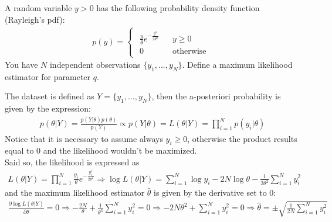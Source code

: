 \Exercise[number={8}]
A random variable \(y>0\) has the following probability density function
(Rayleigh's pdf):
\begin{align*}
    p(y)=
    \begin{cases}
        \begin{matrix}
            \frac{y}{\theta}e^{-\frac{y^2}{2\theta^2}} && y\ge0 \\ 0 && \text{otherwise}
        \end{matrix}
    \end{cases}
\end{align*}
You have \(N\) independent observations \(\{y_1,...,y_N\}\). Define a
maximum likelihood estimator for parameter \(q\). 

\Answer[number={8}]
The dataset is defined as \(Y=\{y_1,...,y_N\}\), then the a-posteriori
probability is given by the expression:
\begin{align*}
    p(\theta|Y)=\frac{p(Y|\theta)p(\theta)}{p(Y)}
    \propto
    p(Y|\theta)=L(\theta|Y)=\prod_{i=1}^{N}p(y_i|\theta)
\end{align*}
Notice that it is necessary to assume always \(y_i\ge0\), otherwise the
product results equal to 0 and the likelihood wouldn't be maximized. \\
Said so, the likelihood is expressed as
\begin{align*}
    L(\theta|Y)=\prod_{i=1}^{N}\frac{y_i}{\theta}e^{-\frac{y_i^2}{2\theta^2}}
    \Rightarrow
    \log{L(\theta|Y)}=\sum_{i=1}^{N}\log{y_i} - 2N\log{\theta} - \frac{1}{2\theta^2}\sum_{i=1}^{N}y_i^2
\end{align*}
and the maximum likelihood estimator \(\hat{\theta}\) is given by the derivative
set to 0:
\begin{align*}
    \frac{\partial{\log{L(\theta|Y)}}}{\partial{\theta}}=0
    \Rightarrow
    -\frac{2N}{\theta} + \frac{1}{\theta^3}\sum_{i=1}^{N}y_i^2=0
    \Rightarrow
    -2N\theta^2 + \sum_{i=1}^{N}y_i^2=0
    \Rightarrow
    \hat{\theta}=\pm\sqrt{\frac{1}{2N}\sum_{i=1}^{N}y_i^2}
\end{align*}